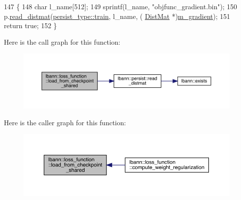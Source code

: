 \begin{DoxyCode}
147                                                             \{
148     \textcolor{keywordtype}{char} l\_name[512];
149     sprintf(l\_name, \textcolor{stringliteral}{"objfunc\_gradient.bin"});
150     p.\hyperlink{classlbann_1_1persist_aa98be93f33b510e5b506b61de6bd79bd}{read\_distmat}(\hyperlink{namespacelbann_adee41f31f15f3906cbdcce4a1417eb56a61b3a8faa9c1091806675c230a9abe64}{persist\_type::train}, l\_name, (
      \hyperlink{base_8hpp_a0fab5387556805cfeac3e7e567bf66c5}{DistMat} *)\hyperlink{classlbann_1_1loss__function_ac6ac9f8f2cef7a4daa1b282dba914975}{m\_gradient});
151     \textcolor{keywordflow}{return} \textcolor{keyword}{true};
152    \}
\end{DoxyCode}
Here is the call graph for this function\+:\nopagebreak
\begin{figure}[H]
\begin{center}
\leavevmode
\includegraphics[width=350pt]{classlbann_1_1loss__function_ae948babd62a110e2407271f24dcaec1b_cgraph}
\end{center}
\end{figure}
Here is the caller graph for this function\+:\nopagebreak
\begin{figure}[H]
\begin{center}
\leavevmode
\includegraphics[width=350pt]{classlbann_1_1loss__function_ae948babd62a110e2407271f24dcaec1b_icgraph}
\end{center}
\end{figure}
\mbox{\label{classlbann_1_1loss__function_ab882c642619ea4285b61e735d84e401c}} 
